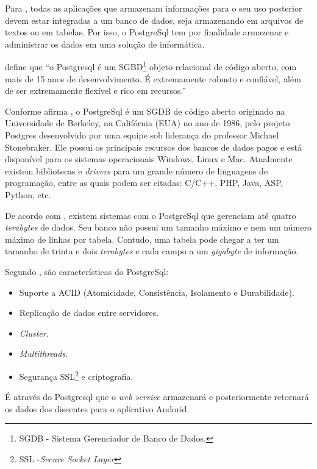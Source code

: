 
	\par Para , todas as aplicações que armazenam
informações para o seu uso posterior devem estar integradas a um banco de
dados, seja armazenando em arquivos de textos ou em tabelas. Por isso, o
PostgreSql tem por finalidade armazenar e administrar os dados em uma solução
de informática.
	
	\par {} define que “o Postgresql é um
SGBD\footnote{SGDB - Sistema Gerenciador de Banco de Dados.} objeto-relacional
de código aberto, com mais de 15 anos de desenvolvimento. É extremamente
robusto e confiável, além de ser extremamente flexível e rico em recursos.”

	\par Conforme afirma , o PostgreSql é um SGDB de código
aberto originado na Universidade de Berkeley, na Califórnia (EUA) no ano de
1986, pelo projeto Postgres desenvolvido por uma equipe sob liderança do
professor Michael Stonebraker. Ele possui os principais recursos dos bancos de
dados pagos e está disponível para os sistemas operacionais Windows, Linux e
Mac. Atualmente existem bibliotecas e \textit{drivers} para um grande número de
linguagens de programação, entre as quais podem ser citadas: C/C++, PHP, Java,
ASP, Python, etc.

	\par De acordo com , existem sistemas com o
PostgreSql que gerenciam até quatro \textit{terabytes} de dados. Seu banco não
possui um tamanho máximo e nem um número máximo de linhas por tabela. Contudo,
uma tabela pode chegar a ter um tamanho de trinta e dois \textit{terabytes} e
cada campo a um \textit{gigabyte} de informação.

	\par Segundo , são características do PostgreSql:

		\begin{itemize}
		  
			\item Suporte a ACID (Atomicidade, Consistência, Isolamento e Durabilidade). 
			  
			\item Replicação de dados entre servidores.
			  
			\item \textit{Cluster}.
			  
			\item \textit{Multithreads}.
			  
			\item Segurança SSL\footnote{SSL -\textit{Secure Socket Layer}} e
			criptografia.
		    
		\end{itemize}

	\par É através do Postgresql que o \textit{web service} armazenará e
posteriormente retornará os dados dos discentes para o aplicativo Andorid.